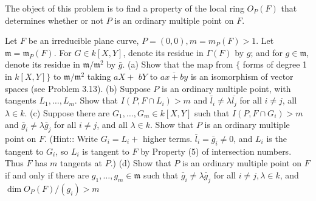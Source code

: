 \documentclass[11pt]{article}
\begin{document}
\begin{problem}{3.24}{}
	The object of this problem is to find a property of the local ring ${O}_P(F)$ that determines whether or not $P$ is an ordinary multiple point on $F$.
	
	Let $F$ be an irreducible plane curve, $P=(0,0), m=m_P(F)>1$. Let $\mathfrak{m}=\mathfrak{m}_P(F)$. For $G \in k[X, Y]$, denote its residue in $\Gamma(F)$ by $g$; and for $g \in \mathfrak{m}$, denote its residue in $\mathfrak{m} / \mathfrak{m}^2$ by $\bar{g}$. (a) Show that the map from $\{$ forms of degree 1 in $k[X, Y]\}$ to $\mathfrak{m} / \mathfrak{m}^2$ taking $a X+$ $b Y$ to $\overline{a x+b y}$ is an isomorphism of vector spaces (see Problem 3.13). (b) Suppose $P$ is an ordinary multiple point, with tangents $L_1, \ldots, L_m$. Show that $I\left(P, F \cap L_i\right)>m$ and $\bar{l}_i \neq \lambda \overline{l_j}$ for all $i \neq j$, all $\lambda \in k$. (c) Suppose there are $G_1, \ldots, G_m \in k[X, Y]$ such that $I\left(P, F \cap G_i\right)>m$ and $\bar{g}_i \neq \lambda \bar{g}_j$ for all $i \neq j$, and all $\lambda \in k$. Show that $P$ is an ordinary multiple point on $F$. (Hint:: Write $G_i=L_i+$ higher terms. $\bar{l}_i=\bar{g}_i \neq 0$, and $L_i$ is the tangent to $G_i$, so $L_i$ is tangent to $F$ by Property (5) of intersection numbers. Thus $F$ has $m$ tangents at $P$.) (d) Show that $P$ is an ordinary multiple point on $F$ if and only if there are $g_1, \ldots, g_m \in \mathfrak{m}$ such that $\bar{g}_i \neq \lambda \bar{g}_j$ for all $i \neq j, \lambda \in k$, and $\operatorname{dim} {O}_P(F) /\left(g_i\right)>m$
\end{problem}
\end{document}
